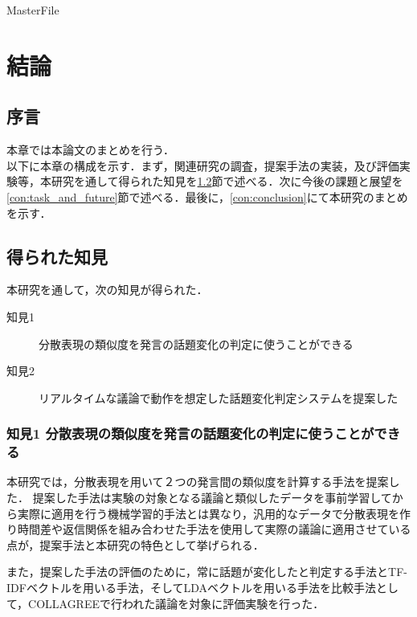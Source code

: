\expandafter\ifx\csname MasterFile\endcsname\relax
\def\SubFile{hoge}


\setcounter{chapter}{5}
\fi
\cleardoublepage
\chapter{結論}
\label{con:chapter}

\section{序言}
\label{con:introduction}
本章では本論文のまとめを行う．\\
以下に本章の構成を示す．まず，関連研究の調査，提案手法の実装，及び評価実験等，本研究を通して得られた知見を\ref{con:knowledge}節で述べる．次に今後の課題と展望を\ref{con:task_and_future}節で述べる．最後に，\ref{con:conclusion}にて本研究のまとめを示す．

\section{得られた知見}
\label{con:knowledge}
本研究を通して，次の知見が得られた．
\begin{description}
  \item[知見1] 分散表現の類似度を発言の話題変化の判定に使うことができる
  \item[知見2] リアルタイムな議論で動作を想定した話題変化判定システムを提案した
\end{description}

\subsection*{知見1 分散表現の類似度を発言の話題変化の判定に使うことができる}
本研究では，分散表現を用いて２つの発言間の類似度を計算する手法を提案した．
提案した手法は実験の対象となる議論と類似したデータを事前学習してから実際に適用を行う機械学習的手法とは異なり，汎用的なデータで分散表現を作り時間差や返信関係を組み合わせた手法を使用して実際の議論に適用させている点が，提案手法と本研究の特色として挙げられる．

また，提案した手法の評価のために，常に話題が変化したと判定する手法とTF-IDFベクトルを用いる手法，そしてLDAベクトルを用いる手法を比較手法として，COLLAGREEで行われた議論を対象に評価実験を行った．

